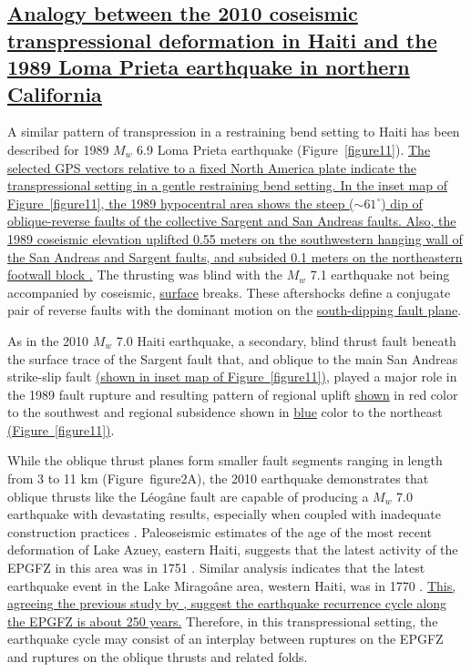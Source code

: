 \documentclass[linenumbers,draft]{agujournal}
\begin{document}
\subsection{\ul{Analogy between the 2010 coseismic transpressional deformation in Haiti and the 1989 Loma Prieta earthquake in northern California}}

A similar pattern of transpression in a restraining bend setting to Haiti has been described for 1989 $M_w$ 6.9 Loma Prieta earthquake \citep{marshall1991faulting} (Figure~\ref{figure11}). \ul{The selected GPS vectors relative to a fixed North America plate}\underline{ \citep{UNAVCO2009}}\ul{ indicate the transpressional setting in a gentle restraining bend setting. In the inset map of Figure~{\ref{figure11}}, the 1989 hypocentral area}\underline{ \citep{marshall1991faulting}}\ul{ shows the steep ($\sim61^{\circ}$) dip of oblique-reverse faults of the collective Sargent and San Andreas faults. Also, the 1989 coseismic elevation uplifted 0.55 meters on the southwestern hanging wall of the San Andreas and Sargent faults, and subsided 0.1 meters on the northeastern footwall block}\underline{ \citep{marshall1991faulting}.} The thrusting was blind with the $M_w$ 7.1 earthquake not being accompanied by coseismic, \ul{surface} breaks. These aftershocks define a conjugate pair of reverse faults with the dominant motion on the \ul{south-dipping fault plane}.

As in the 2010 $M_w$ 7.0 Haiti earthquake, a secondary, blind thrust fault \underline{\citep{olson1990seismicity}} beneath the surface trace of the Sargent fault that, and oblique to the main San Andreas strike-slip fault \ul{(shown in inset map of Figure~{\ref{figure11}})}, played a major role in the 1989 fault rupture and resulting pattern of regional uplift \ul{shown} in red color to the southwest and regional subsidence shown in \ul{blue} color to the northeast \underline{(Figure~\ref{figure11})}.

While the oblique thrust planes form smaller fault segments ranging in length from 3 to 11 km (Figure~{figure2}A), the 2010 earthquake demonstrates that oblique thrusts like the L\'eog\^ane fault are capable of producing a $M_w$ 7.0 earthquake with devastating results, especially when coupled with inadequate construction practices \citep{symithe2016present}. Paleoseismic estimates of the age of the most recent deformation of Lake Azuey, eastern Haiti, suggests that the latest activity of the EPGFZ in this area was in 1751 \citep{prentice2010seismic,bakun2012significant}. Similar analysis indicates that the latest earthquake event in the Lake Mirago\^ane area, western Haiti, was in 1770 \citep{bakun2012significant}. \ul{This, agreeing the previous study by }\underline{\citet{bakun2012significant},}\ul{ suggest the earthquake recurrence cycle along the EPGFZ is about 250 years.} Therefore, in this transpressional setting, the earthquake cycle may consist of an interplay between ruptures on the EPGFZ and ruptures on the oblique thrusts and related folds. 
\end{document}
